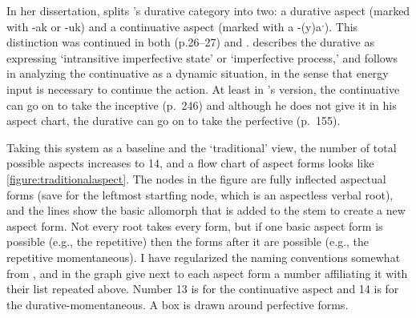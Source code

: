 In her dissertation, \citet[p.~263--269]{rose1981} splits \citeauthor{sapir1939}'s durative category into two: a durative aspect (marked with -ak or -uk) and a continuative aspect (marked with a -(y)aˑ). This distinction was continued in both \citet{nakayama2001} (p.26--27) and \citet[p~.232--237]{davidson2002}. \citeauthor{davidson2002} describes the durative as expressing `intransitive imperfective state' or `imperfective process,' and follows \citeauthor{rose1981} in analyzing the continuative as a dynamic situation, in the sense that energy input is necessary to continue the action. At least in \citeauthor{davidson2002}'s version, the continuative can go on to take the inceptive (p.\ 246) and although he does not give it in his aspect chart, the durative can go on to take the perfective (p.\ 155).

Taking this system as a baseline and the `traditional' view, the number of total possible aspects increases to 14, and a flow chart of aspect forms looks like \cref{figure:traditionalaspect}. The nodes in the figure are fully inflected aspectual forms (save for the leftmost startfing node, which is an aspectless verbal root), and the lines show the basic allomorph that is added to the stem to create a new aspect form. Not every root takes every form, but if one basic aspect form is possible (e.g., the repetitive) then the forms after it are possible (e.g., the repetitive momentaneous). I have regularized the naming conventions somewhat from \citeauthor{sapir1939}, and in the graph give next to each aspect form a number affiliating it with their list repeated above. Number 13 is for the continuative aspect and 14 is for the durative-momentaneous. A box is drawn around perfective forms.

